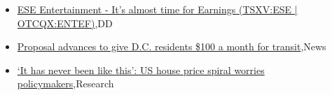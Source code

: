 \documentclass{article}%
\begin{document}
%
\begin{itemize}%
\item%
\href{https://reddit.com/r/Baystreetbets/comments/xqhgqp/ese\_entertainment\_its\_almost\_time\_for\_earnings/}{ESE Entertainment - It's almost time for Earnings (TSXV:ESE | OTCQX:ENTEF)},DD%
\item%
\href{https://reddit.com/r/Economics/comments/xqrthw/proposal\_advances\_to\_give\_dc\_residents\_100\_a/}{Proposal advances to give D.C. residents \$100 a month for transit},News%
\item%
\href{https://reddit.com/r/Economics/comments/xqr04j/it\_has\_never\_been\_like\_this\_us\_house\_price\_spiral/}{‘It has never been like this’: US house price spiral worries policymakers},Research%
\end{itemize}%
\end{document}
